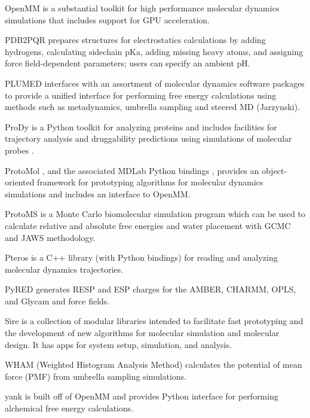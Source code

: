 OpenMM  \cite{Eastman_2013} is a substantial toolkit for high performance molecular dynamics simulations that includes support for GPU acceleration.

PDB2PQR \cite{Dolinsky_2007} prepares structures for electrostatics calculations by adding hydrogens, calculating sidechain pKa, adding missing heavy atoms, and assigning force field-dependent parameters; users can specify an ambient pH.

PLUMED \cite{Tribello_2014} interfaces with an assortment of molecular dynamics software packages to provide a unified interface for performing free energy calculations using methods such as metadynamics, umbrella sampling and steered MD (Jarzynski).

ProDy \cite{Bakan_2011} is a Python toolkit for analyzing proteins and includes facilities for trajectory analysis and druggability predictions using simulations of molecular probes \cite{Bakan_2012}.

ProtoMol \cite{Matthey_2004}, and the associated MDLab Python bindings \cite{Cickovski_2009}, provides an object-oriented framework for prototyping algorithms for molecular dynamics simulations and includes an interface to OpenMM.

ProtoMS \cite{Michel_2006} is a Monte Carlo biomolecular simulation program which can be used to calculate relative and absolute free energies and water placement with GCMC and JAWS methodology.

Pteros \cite{Yesylevskyy_2015} is a C++ library (with Python bindings) for reading and analyzing molecular dynamics trajectories.

PyRED \cite{Dupradeau_2010} generates RESP and ESP charges for the AMBER, CHARMM, OPLS, and Glycam and force fields.

Sire is a collection of modular libraries intended to facilitate fast prototyping and the development of new algorithms for molecular simulation and molecular design. It has apps for system setup, simulation, and analysis.

WHAM (Weighted Histogram Analysis Method) calculates the potential of mean force (PMF) from umbrella sampling simulations.

yank is built off of OpenMM and provides Python interface for performing alchemical free energy calculations.